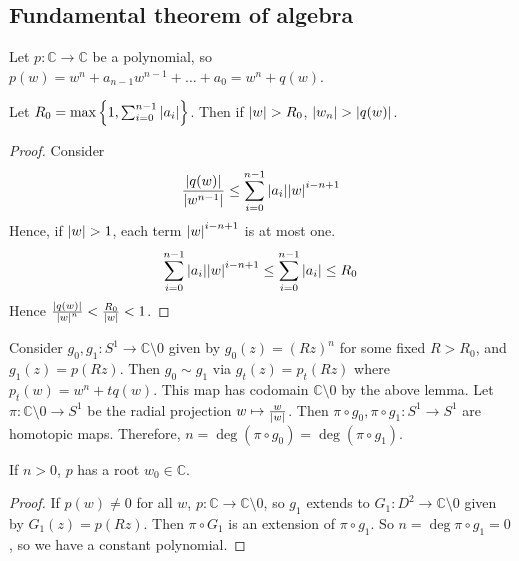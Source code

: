 \subsection{Fundamental theorem of algebra}
Let \( p \colon \mathbb C \to \mathbb C \) be a polynomial, so \( p(w) = w^n + a_{n-1} w^{n-1} + \dots + a_0 = w^n + q(w) \).
\begin{lemma}
	Let \( R_0 = \max \qty{1, \sum_{i=0}^{n-1} \abs{a_i}} \).
	Then if \( \abs{w} > R_0 \), \( \abs{w_n} > \abs{q(w)} \).
\end{lemma}
\begin{proof}
	Consider
	\[ \frac{\abs{q(w)}}{\abs{w^{n-1}}} \leq \sum_{i=0}^{n-1} \abs{a_i} \abs{w}^{i-n+1} \]
	Hence, if \( \abs{w} > 1 \), each term \( \abs{w}^{i-n+1} \) is at most one.
	\[ \sum_{i=0}^{n-1} \abs{a_i} \abs{w}^{i-n+1} \leq \sum_{i=0}^{n-1} \abs{a_i} \leq R_0 \]
	Hence \( \frac{\abs{q(w)}}{\abs{w}^n} < \frac{R_0}{\abs{w}} < 1 \).
\end{proof}
Consider \( g_0, g_1 \colon S^1 \to \mathbb C \setminus \qty{0} \) given by \( g_0(z) = (Rz)^n \) for some fixed \( R > R_0 \), and \( g_1(z) = p(Rz) \).
Then \( g_0 \sim g_1 \) via \( g_t(z) = p_t(Rz) \) where \( p_t(w) = w^n + tq(w) \).
This map has codomain \( \mathbb C \setminus \qty{0} \) by the above lemma.
Let \( \pi \colon \mathbb C \setminus \qty{0} \to S^1 \) be the radial projection \( w \mapsto \frac{w}{\abs{w}} \).
Then \( \pi \circ g_0, \pi \circ g_1 \colon S^1 \to S^1 \) are homotopic maps.
Therefore, \( n = \deg (\pi \circ g_0) = \deg (\pi \circ g_1) \).
\begin{theorem}
	If \( n > 0 \), \( p \) has a root \( w_0 \in \mathbb C \).
\end{theorem}
\begin{proof}
	If \( p(w) \neq 0 \) for all \( w \), \( p \colon \mathbb C \to \mathbb C \setminus \qty{0} \), so \( g_1 \) extends to \( G_1 \colon D^2 \to \mathbb C \setminus \qty{0} \) given by \( G_1(z) = p(Rz) \).
	Then \( \pi \circ G_1 \) is an extension of \( \pi \circ g_1 \).
	So \( n = \deg \pi \circ g_1 = 0 \), so we have a constant polynomial.
\end{proof}

